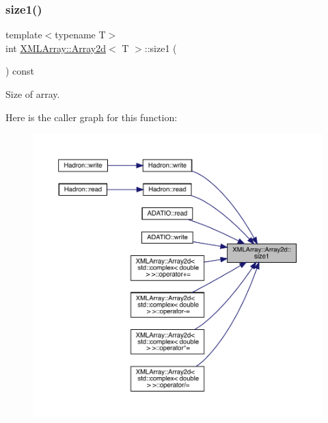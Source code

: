 \subsubsection{\texorpdfstring{size1()}{size1()}\hspace{0.1cm}{\footnotesize\ttfamily [1/3]}}
{\footnotesize\ttfamily template$<$typename T$>$ \\
int \mbox{\hyperlink{classXMLArray_1_1Array2d}{X\+M\+L\+Array\+::\+Array2d}}$<$ T $>$\+::size1 (\begin{DoxyParamCaption}{ }\end{DoxyParamCaption}) const\hspace{0.3cm}{\ttfamily [inline]}}



Size of array. 

Here is the caller graph for this function\+:
\nopagebreak
\begin{figure}[H]
\begin{center}
\leavevmode
\includegraphics[width=350pt]{dc/ddc/classXMLArray_1_1Array2d_a0f5dd764b391ddffd3d89c71bbc6c614_icgraph}
\end{center}
\end{figure}
\mbox{\label{classXMLArray_1_1Array2d_a0f5dd764b391ddffd3d89c71bbc6c614}} 
